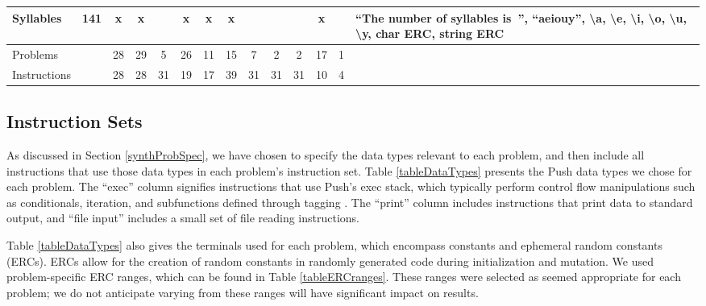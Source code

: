 \documentclass{sig-alternate}
\begin{document}
\begin{table*}
\begin{tabular}{>{\raggedright}p{2.6cm}rccccccccccc>{\raggedright}p{5.5cm}}
Syllables                  & 141             & x    & x       &       & x       & x    & x      &                    &                  &                   & x     &            & ``The number of syllables is~'', ``aeiouy'', \textbackslash a, \textbackslash e, \textbackslash i, \textbackslash o, \textbackslash u, \textbackslash y, char ERC, string ERC                                                   \tabularnewline
\midrule
\rowcolor{white} Problems                      &                 & 28   & 29      & 5     & 26      & 11   & 15     & 7                  & 2                & 2                 & 17    & 1          &                                                                                                                                                                                                                             \tabularnewline
\rowcolor{white} Instructions     &                 & 28   & 28      & 31    & 19      & 17   & 39     & 31                 & 31               & 31                & 10    & 4          &                                                                                                                                                                                                                             \tabularnewline
\bottomrule
\end{tabular}
\end{table*}

\subsection{Instruction Sets}

As discussed in Section \ref{synthProbSpec}, we have chosen to specify the data types relevant to each problem, and then include all instructions that use those data types in each problem's instruction set. Table \ref{tableDataTypes} presents the Push data types we chose for each problem. The ``exec'' column signifies instructions that use Push's exec stack, which typically perform control flow manipulations such as conditionals, iteration, and subfunctions defined through tagging \cite{Spector:2011:GECCO}. The ``print'' column includes instructions that print data to standard output, and ``file input'' includes a small set of file reading instructions. 

Table \ref{tableDataTypes} also gives the terminals used for each problem, which encompass constants and ephemeral random constants (ERCs). ERCs allow for the creation of random constants in randomly generated code during initialization and mutation. We used problem-specific ERC ranges, which can be found in Table \ref{tableERCranges}. These ranges were selected as seemed appropriate for each problem; we do not anticipate varying from these ranges will have significant impact on results.
\end{document}
